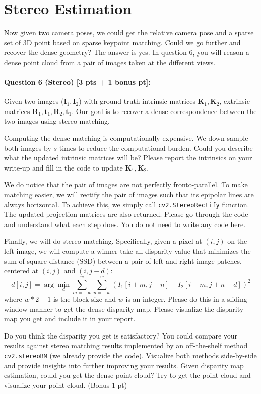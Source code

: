 \documentclass[11pt]{article}
\begin{document}
\section*{Stereo Estimation}

Now given two camera poses, we could get the relative camera pose and a sparse set of 3D point based on sparse keypoint matching. Could we go further and recover the dense geometry? The answer is yes. In question 6, you will reason a dense point cloud from a pair of images taken at the different views. 

\paragraph{Question 6 (Stereo) [3 pts + 1 bonus pt]:}
Given two images ($\mathbf{I}_1, \mathbf{I}_2$) with ground-truth intrinsic matrices $\mathbf{K}_1, \mathbf{K}_2$, extrinsic matrices $\mathbf{R}_1, \mathbf{t}_1, \mathbf{R}_2, \mathbf{t}_1$. Our goal is to recover a dense correspondence between the two images using stereo matching. 

Computing the dense matching is computationally expensive. We down-sample both images by $s$ times to reduce the computational burden. Could you describe what the updated intrinsic matrices will be? Please report the intrinsics on your write-up and fill in the code to update $\mathbf{K}_1, \mathbf{K}_2$. 

We do notice that the pair of images are not perfectly fronto-parallel. To make matching easier, we will rectify the pair of images such that its epipolar lines are always horizontal. To achieve this, we simply call \texttt{cv2.StereoRectify} function. The updated projection matrices are also returned. Please go through the code and understand what each step does. You do not need to write any code here. 

Finally, we will do stereo matching. Specifically, given a pixel at $(i, j)$ on the left image, we will compute a winner-take-all disparity value that minimizes the sum of square distance (SSD) between a pair of left and right image patches, centered at $(i, j)$ and $(i, j-d)$: 
\[
d[i, j] = \arg\min_d \sum_{m=-w}^{w} \sum_{n=-w}^{w} ( I_1[i+m, j+n] - I_2[i+m, j+n-d] )^2
\]
where $w*2+1$ is the block size and $w$ is an integer. Please do this in a sliding window manner to get the dense disparity map. Please visualize the disparity map you get and include it in your report.

Do you think the disparity you get is satisfactory? You could compare your results against stereo matching results implemented by an off-the-shelf method \texttt{cv2.stereoBM} (we already provide the code). Visualize both methods side-by-side and provide insights into further improving your results. Given disparity map estimation, could you get the dense point cloud? Try to get the point cloud and visualize your point cloud.  (Bonus 1 pt)
\end{document}
